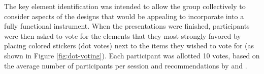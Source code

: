 \documentclass[letterpaper, 12pt]{article}
\begin{document}
The key element identification was intended to allow the group collectively to consider aspects of the designs that would be appealing to incorporate into a fully functional instrument. When the presentations were finished, participants were then asked to vote for the elements that they most strongly favored by placing colored stickers (dot votes) next to the items they wished to vote for (as shown in Figure \ref{fig:dot-voting}). Each participant was allotted 10 votes, based on the average number of participants per session and recommendations by \citet{Gray2010} and \citet{Gibbons2019}. 

\end{document}
